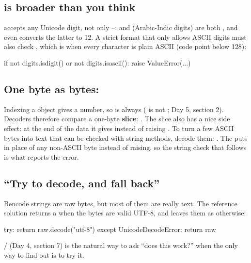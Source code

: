 \documentclass[10pt,a4paper]{article}
\begin{document}
\subsection{ is broader than you think}
 accepts any Unicode digit, not only –:  and  (Arabic-Indic digits) are both , and  even converts the latter to 12. A strict format that only allows ASCII digits must also check , which is  when every character is plain ASCII (code point below 128):
\begin{pycode}
if not digits.isdigit() or not digits.isascii():
    raise ValueError(...)
\end{pycode}
\subsection{One byte as bytes: }
Indexing a  object gives a number, so  is always  ( is not ; Day 5, section 2). Decoders therefore compare a one-byte \textbf{slice}: . The slice also has a nice side effect: at the end of the data it gives  instead of raising .
To turn a few ASCII bytes into text that can be checked with string methods, decode them: . The  puts  in place of any non-ASCII byte instead of raising, so the string check that follows is what reports the error.
\subsection{“Try to decode, and fall back”}
Bencode strings are raw bytes, but most of them are really text. The reference solution returns a  when the bytes are valid UTF-8, and leaves them as  otherwise:
\begin{pycode}
try:
    return raw.decode("utf-8")
except UnicodeDecodeError:
    return raw
\end{pycode}
/ (Day 4, section 7) is the natural way to ask “does this work?” when the only way to find out is to try it.
\end{document}

